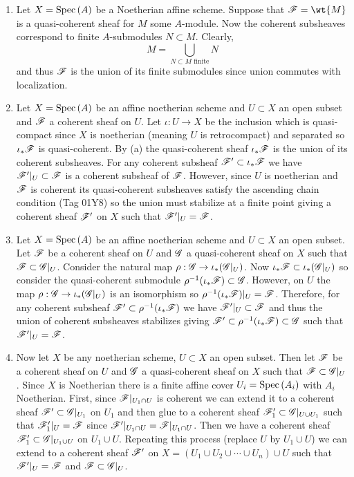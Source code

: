 \documentclass[12pt]{article}
\begin{document}
\begin{enumerate}
\item Let $X = \mathrm{Spec}\left( A \right)$ be a Noetherian affine scheme. Suppose that $\F = \wt{M}$ is a quasi-coherent sheaf for $M$ some $A$-module. Now the coherent subsheaves correspond to finite $A$-submodules $N \subset M$. Clearly,
\[ M = \bigcup_{N \subset M \text{ finite}} N \]
and thus $\mathscr{F}$ is the union of its finite submodules since union commutes with localization.

\item Let $X = \mathrm{Spec}\left( A \right)$ be an affine noetherian scheme and $U \subset X$ an open subset and $\mathscr{F}$ a coherent sheaf on $U$. Let $\iota : U \to X$ be the inclusion which is quasi-compact since $X$ is noetherian (meaning $U$ is retrocompact) and separated so $\iota_* \mathscr{F}$ is quasi-coherent. By (a) the quasi-coherent sheaf $\iota_* \mathscr{F}$ is the union of its coherent subsheaves. For any coherent subsheaf $\mathscr{F}' \subset \iota_* \mathscr{F}$ we have $\mathscr{F}'|_U \subset \mathscr{F}$ is a coherent subsheaf of $\mathscr{F}$. However, since $U$ is noetherian and $\mathscr{F}$ is coherent its quasi-coherent subsheaves satisfy the ascending chain condition (Tag 01Y8) so the union must stabilize at a finite point giving a coherent sheaf $\mathscr{F}'$ on $X$ such that $\mathscr{F}'|_U = \mathscr{F}$.

\item Let $X = \mathrm{Spec}\left( A \right)$ be an affine noetherian scheme and $U \subset X$ an open subset. Let $\mathscr{F}$ be a coherent sheaf on $U$ and $\mathscr{G}$ a quasi-coherent sheaf on $X$ such that $\mathscr{F} \subset \mathscr{G}|_U$. Consider the natural map $\rho : \mathscr{G} \to \iota_* (\mathscr{G}|_U)$. Now $\iota_* \mathscr{F} \subset \iota_* (\mathscr{G}|_U)$ so consider the quasi-coherent submodule $\rho^{-1}(\iota_* \mathscr{F}) \subset \mathscr{G}$. However, on $U$ the map $\rho : \mathscr{G} \to \iota_* (\mathscr{G}|_U)$ is an isomorphism so $\rho^{-1}(\iota_* \mathscr{F}) |_U = \mathscr{F}$. Therefore, for any coherent subsheaf $\mathscr{F}' \subset \rho^{-1}(\iota_* \mathscr{F})$ we have $\mathscr{F}'|_U \subset \mathscr{F}$ and thus the union of coherent subsheaves stabilizes giving $\mathscr{F}' \subset \rho^{-1}(\iota_* \mathscr{F})  \subset \mathscr{G}$ such that $\mathscr{F}'|_U = \mathscr{F}$.

\item Now let $X$ be any noetherian scheme, $U \subset X$ an open subset. Then let $\mathscr{F}$ be a coherent sheaf on $U$ and $\mathscr{G}$ a quasi-coherent sheaf on $X$ such that $\mathscr{F} \subset \mathscr{G}|_U$. Since $X$ is Noetherian there is a finite affine cover $U_i = \mathrm{Spec}\left( A_i \right)$ with $A_i$ Noetherian.
First, since $\mathscr{F}|_{U_1 \cap U}$ is coherent we can extend it to a coherent sheaf $\mathscr{F}' \subset \mathscr{G}|_{U_1}$ on $U_1$ and then glue to a coherent sheaf $\mathscr{F}'_1 \subset \mathscr{G}|_{U \cup U_1}$ such that $\mathscr{F}'_1 |_U = \mathscr{F}$ since $\mathscr{F}'|_{U_1 \cap U} = \mathscr{F}|_{U_1 \cap U}$. Then we have a coherent sheaf $\mathscr{F}'_1 \subset \mathscr{G}|_{U_1 \cup U}$ on $U_1 \cup U$. Repeating this process (replace $U$ by $U_1 \cup U$) we can extend to a coherent sheaf $\mathscr{F}'$ on $X = (U_1 \cup U_2 \cup \cdots \cup U_n) \cup U$ such that $\mathscr{F}'|_U = \mathscr{F}$ and $\mathscr{F} \subset \mathscr{G}|_U$.


\end{enumerate}
\end{document}
